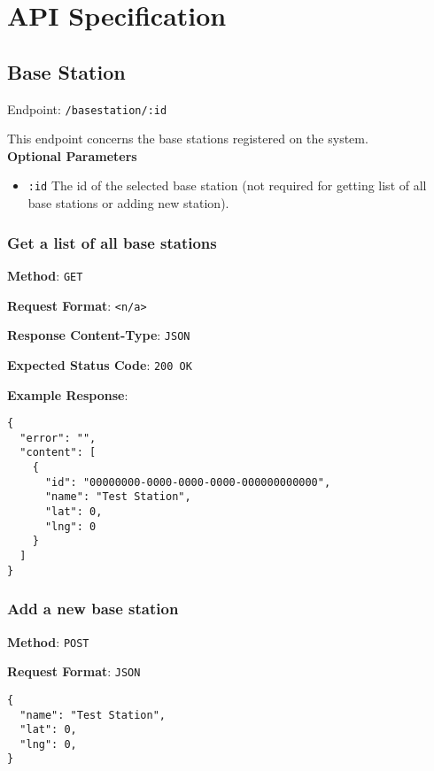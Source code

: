 \chapter{API Specification} \label{app:apispec}

\section{Base Station}

Endpoint: \texttt{/basestation/:id}

\noindent
This endpoint concerns the base stations registered on the system.\\

\noindent
\textbf{Optional Parameters}
\begin{itemize}
   \item \texttt{:id} \textemdash The id of the selected base station (not required for getting list of all base stations or adding new station).
\end{itemize}


\subsection{Get a list of all base stations}

\noindent
\textbf{Method}: \texttt{GET}

\noindent
\textbf{Request Format}: \texttt{<n/a>}

\noindent
\textbf{Response Content-Type}: \texttt{JSON}

\noindent
\textbf{Expected Status Code}: \texttt{200 OK}

\noindent
\textbf{Example Response}:
\begin{verbatim}
{ 
  "error": "",
  "content": [
    {
      "id": "00000000-0000-0000-0000-000000000000",
      "name": "Test Station",
      "lat": 0,
      "lng": 0
    }
  ]
}
\end{verbatim}


\subsection{Add a new base station}

\noindent
\textbf{Method}: \texttt{POST}

\noindent
\textbf{Request Format}: \texttt{JSON}
\begin{verbatim}
{ 
  "name": "Test Station",
  "lat": 0,
  "lng": 0,
}
\end{verbatim}

